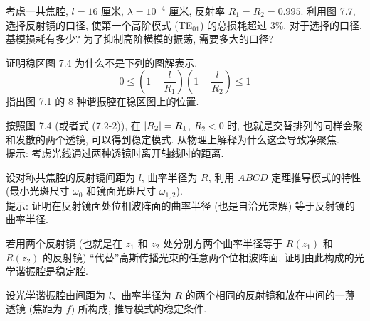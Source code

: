 \documentclass{note}
\begin{document}
\begin{exe}
    考虑一共焦腔, $l=16$ 厘米, $\lambda=10^{-4}$ 厘米, 反射率 $R_1=R_2=0.995$. 利用图 7.7, 选择反射镜的口径, 使第一个高阶模式 (TE$_{01}$) 的总损耗超过 $3\%$. 对于选择的口径, 基模损耗有多少? 为了抑制高阶横模的振荡, 需要多大的口径?
\end{exe}
\begin{sol}
    
\end{sol}

\begin{exe}
    证明稳区图 7.4 为什么不是下列的图解表示.
    \[
        0\leq\left(1-\frac{l}{R_1}\right)\left(1-\frac{l}{R_2}\right)\leq 1
    \]
    指出图 7.1 的 8 种谐振腔在稳区图上的位置.
\end{exe}
\begin{sol}
    
\end{sol}

\begin{exe}
    按照图 7.4 (或者式 (7.2-2)), 在 $\left\lvert R_2\right\rvert=R_1$, $R_2<0$ 时, 也就是交替排列的同样会聚和发散的两个透镜, 可以得到稳定模式. 从物理上解释为什么这会导致净聚焦.\\
    提示: 考虑光线通过两种透镜时离开轴线时的距离.
\end{exe}
\begin{sol}
    
\end{sol}

\begin{exe}
    设对称共焦腔的反射镜间距为 $l$, 曲率半径为 $R$, 利用 $ABCD$ 定理推导模式的特性 (最小光斑尺寸 $\omega_0$ 和镜面光斑尺寸 $\omega_{1,2}$).\\
    提示: 证明在反射镜面处位相波阵面的曲率半径 (也是自洽光束解) 等于反射镜的曲率半径.
\end{exe}
\begin{sol}
    
\end{sol}

\begin{exe}
    若用两个反射镜 (也就是在 $z_1$ 和 $z_2$ 处分别方两个曲率半径等于 $R(z_1)$ 和 $R(z_2)$ 的反射镜) ``代替''高斯传播光束的任意两个位相波阵面, 证明由此构成的光学谐振腔是稳定腔.
\end{exe}
\begin{pf}
    
\end{pf}

\begin{exe}
    设光学谐振腔由间距为 $l$、曲率半径为 $R$ 的两个相同的反射镜和放在中间的一薄透镜 (焦距为 $f$) 所构成, 推导模式的稳定条件.
\end{exe}
\begin{sol}
    
\end{sol}
\end{document}
